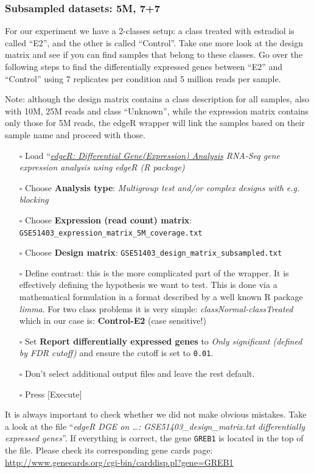 \subsubsection{Subsampled datasets: 5M, 7+7}
For our experiment we have a 2-classes setup: a class treated with estradiol is called ``E2'', and the other is called ``Control''.
Take one more look at the design matrix and see if you can find samples that belong to these classes.
Go over the following steps to find the differentially expressed genes between ``E2'' and ``Control'' using 7 replicates per condition and 5 million reads per sample.

Note: although the design matrix contains a class description for all samples, also with 10M, 25M reads and class ``Unknown'', while the expression matrix contains only those for 5M reads, the edgeR wrapper will link the samples based on their sample name and proceed with those.
\begin{itemize}
	\item [$\square$] Load ``\textit{\underline{edgeR: Differential Gene(Expression) Analysis} RNA-Seq gene expression analysis using edgeR (R package)}
	\item [$\square$] Choose \textbf{Analysis type}: \textit{Multigroup test and/or complex designs with e.g. blocking}
	\item [$\square$] Choose \textbf{Expression (read count) matrix}: {\scriptsize \verb|GSE51403_expression_matrix_5M_coverage.txt|}
	\item [$\square$] Choose \textbf{Design matrix}: \verb|GSE51403_design_matrix_subsampled.txt|
	\item [$\square$] Define contrast: this is the more complicated part of the wrapper. It is effectively defining the hypothesis we want to test. This is done via a mathematical formulation in a format described by a well known R package \textit{limma}. For two class problems it is very simple: \textit{classNormal-classTreated} which in our case is: \textbf{Control-E2} (case sensitive!)
	\item [$\square$] Set \textbf{Report differentially expressed genes} to \textit{Only significant (defined by FDR cutoff)} and ensure the cutoff is set to \verb|0.01|.
	\item [$\square$] Don't select additional output files and leave the rest default.
	\item [$\square$] Press [Execute]
\end{itemize}
It is always important to check whether we did not make obvious mistakes.
Take a look at the file ``\textit{edgeR DGE on \ldots: GSE51403\_design\_matrix.txt differentially expressed genes}''. If everything is correct, the gene \verb|GREB1| is located in the top of the file. Please check its corresponding gene cards page:\\
\url{http://www.genecards.org/cgi-bin/carddisp.pl?gene=GREB1}\\

